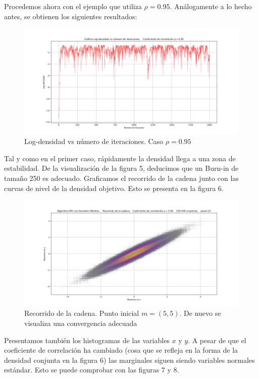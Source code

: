 \documentclass[letterpaper]{article}
\newcommand{\1}{\mathds{1}}
\theoremstyle{definition}
\theoremstyle{definition}
\theoremstyle{definition}
\theoremstyle{definition}
\theoremstyle{definition}
\begin{document}
\begin{itemize}
    Procedemos ahora con el ejemplo que utiliza $\rho=0.95$. Análogamente a lo hecho antes, se 
    obtienen los siguientes resultados:
    \begin{figure}[h!]
        \centering
        \includegraphics[width=\linewidth]{5.png}
        \caption{Log-densidad vs número de iteraciones. Caso $\rho=0.95$}
    \end{figure} 
    Tal y como en el primer caso, rápidamente la densidad llega a una zona de estabilidad. De la 
    visualización de la figura 5, deducimos que un Burn-in de tamaño 250 es 
    adecuado. Graficamos el recorrido de la cadena junto con las curvas de nivel 
    de la densidad objetivo. Esto se presenta en la figura 6.\\

    \begin{figure}[h!]
        \centering
        \includegraphics[width=\linewidth]{6.png}
        \caption{Recorrido de la cadena. Punto inicial $m=(5,5)$. De nuevo se visualiza una convergencia adecuada}
    \end{figure} 
    Presentamos también los histogramas de las variables $x$ y $y$. A pesar de 
    que el coeficiente de correlación ha cambiado (cosa que se refleja en la forma
    de la densidad conjunta en la figura 6) las marginales siguen siendo 
    variables normales estándar. Esto se puede comprobar con las figuras 7 y 8.\\


\end{itemize}
\end{document}
